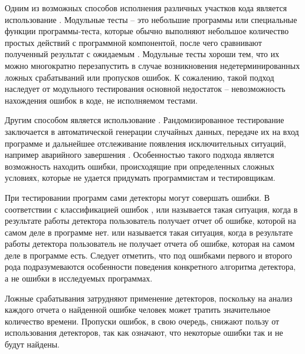 Одним из возможных способов исполнения различных участков кода является использование .
Модульные тесты -- это небольшие программы или специальные функции программы-теста, которые обычно выполняют небольшое количество простых действий с программной компонентой, после чего сравнивают полученный результат с ожидаемым \cite{timur}.
Модульные тесты хороши тем, что их можно многократно перезапустить в случае возникновения недетерминированных ложных срабатываний или пропусков ошибок.
К сожалению, такой подход наследует от модульного тестирования основной недостаток -- невозможность нахождения ошибок в коде, не исполняемом тестами.

Другим способом является использование .
Рандомизированное тестирование заключается в автоматической генерации случайных данных, передаче их на вход программе и дальнейшее отслеживание появления исключительных ситуаций, например аварийного завершения \cite{wiki-fuzz-testing}.
Особенностью такого подхода является возможность находить ошибки, происходящие при определенных сложных условиях, которые не удается придумать программистам и тестировщикам.

При тестировании программ сами детекторы могут совершать ошибки.
В соответствии с классификацией ошибок \cite{timur},
 или  называется такая ситуация, когда в результате работы детектора пользователь получает отчет об ошибке, которой на самом деле в программе нет.
 или  называется такая ситуация, когда в результате работы детектора пользователь не получает отчета об ошибке, которая на самом деле в программе есть.
Следует отметить, что под ошибками первого и второго рода подразумеваются особенности поведения конкретного алгоритма детектора, а не ошибки в исследуемых программах.

Ложные срабатывания затрудняют применение детекторов, поскольку на анализ каждого отчета о найденной ошибке человек может тратить значительное количество времени.
Пропуски ошибок, в свою очередь, снижают пользу от использования детекторов, так как означают, что некоторые ошибки так и не будут найдены.


